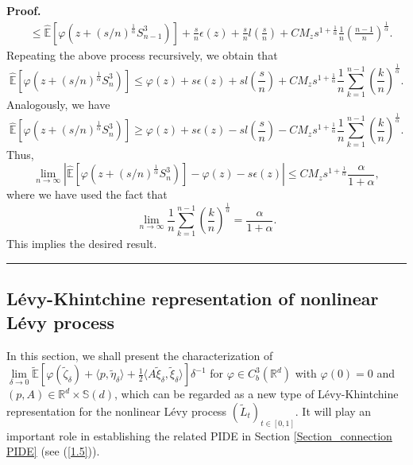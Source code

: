 \documentclass[a4paper,oneside,10pt]{article}%
\newenvironment{proof}[1][Proof]{\noindent \textbf{#1.} }{\  \rule{0.5em}{0.5em}}
\numberwithin{equation}{section}
\begin{document}
\begin{proof}
\begin{align*}
&  \leq \mathbb{\hat{E}}\left[  \varphi \left(  z+(s/n)^{\frac{1}{\alpha}%
}S_{n-1}^{3}\right)  \right]  +\frac{s}{n}\epsilon(z)+\frac{s}{n}l\left(
\frac{s}{n}\right)  +CM_{z}s^{1+\frac{1}{\alpha}}\frac{1}{n}\left(  \frac
{n-1}{n}\right)  ^{\frac{1}{\alpha}}.
\end{align*}
Repeating the above process recursively, we obtain that
\[
\mathbb{\hat{E}}\left[  \varphi \left(  z+(s/n)^{\frac{1}{\alpha}}S_{n}%
^{3}\right)  \right]  \leq \varphi \left(  z\right)  +s\epsilon(z)+sl\left(
\frac{s}{n}\right)  +CM_{z}s^{1+\frac{1}{\alpha}}\frac{1}{n}\sum
\limits_{k=1}^{n-1}\left(  \frac{k}{n}\right)  ^{\frac{1}{\alpha}}.
\]
Analogously, we have
\[
\mathbb{\hat{E}}\left[  \varphi \left(  z+(s/n)^{\frac{1}{\alpha}}S_{n}%
^{3}\right)  \right]  \geq \varphi \left(  z\right)  +s\epsilon(z)-sl\left(
\frac{s}{n}\right)  -CM_{z}s^{1+\frac{1}{\alpha}}\frac{1}{n}\sum
\limits_{k=1}^{n-1}\left(  \frac{k}{n}\right)  ^{\frac{1}{\alpha}}.
\]
Thus,
\[
\lim_{n\rightarrow \infty}\left \vert \mathbb{\hat{E}}\left[  \varphi \left(
z+(s/n)^{\frac{1}{\alpha}}S_{n}^{3}\right)  \right]  -\varphi(z)-s\epsilon
(z)\right \vert \leq CM_{z}s^{1+\frac{1}{\alpha}}\frac{\alpha}{1+\alpha},
\]
where we have used the fact that
\[
\lim_{n\rightarrow \infty}\frac{1}{n}\sum \limits_{k=1}^{n-1}\left(  \frac{k}%
{n}\right)  ^{\frac{1}{\alpha}}=\frac{\alpha}{1+\alpha}.
\]
This implies the desired result.
\end{proof}

\subsection{L\'evy-Khintchine representation of nonlinear L\'evy process}

\label{Section_Representation of Levy process}

In this section, we shall present the characterization of $\lim \limits_{\delta
\rightarrow0}\mathbb{\tilde{E}}[\varphi(\tilde{\zeta} _{\delta})+\langle
p,\tilde{\eta}_{\delta}\rangle+\frac{1}{2}\langle A\tilde{ \xi}_{\delta
},\tilde{\xi}_{\delta}\rangle]\delta^{-1}$ for $\varphi \in C_{b}%
^{3}(\mathbb{R}^{d})$ with $\varphi(0)=0$ and $(p,A)\in \mathbb{R}^{d}%
\times \mathbb{S}(d)$, which can be regarded as a new type of L\'evy-Khintchine
representation for the nonlinear L\'evy process $(\tilde{L}_{t})_{t\in[0,1]}$.
It will play an important role in establishing the related PIDE in Section
\ref{Section_connection PIDE} (see (\ref{1.5})).
\end{document}
